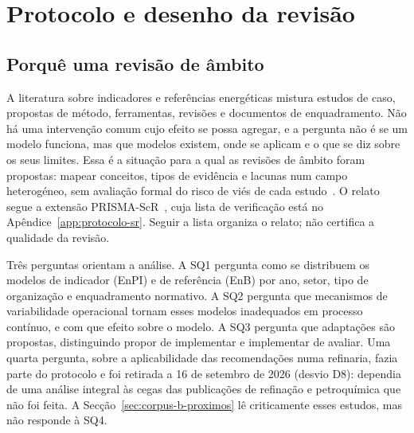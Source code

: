 
\vfill
\section{Protocolo e desenho da revisão}
\label{sec:protocolo-sr}

\subsection{Porquê uma revisão de âmbito}

A literatura sobre indicadores e referências energéticas mistura estudos
de caso, propostas de método, ferramentas, revisões e documentos de
enquadramento. Não há uma intervenção comum cujo efeito se possa agregar,
e a pergunta não é se um modelo funciona, mas que modelos existem, onde
se aplicam e o que se diz sobre os seus limites. Essa é a situação para a
qual as revisões de âmbito foram propostas: mapear conceitos, tipos de
evidência e lacunas num campo heterogéneo, sem avaliação formal do risco
de viés de cada estudo~\cite{Arksey2005,Levac2010,Munn2018}. O relato segue
a extensão PRISMA-ScR~\cite{Tricco2018}, cuja lista de verificação está no
Apêndice~\ref{app:protocolo-sr}. Seguir a lista organiza o relato; não
certifica a qualidade da revisão.

Três perguntas orientam a análise. A SQ1 pergunta como se distribuem os
modelos de indicador (EnPI) e de referência (EnB) por ano, setor, tipo de
organização e enquadramento normativo. A SQ2 pergunta que mecanismos de
variabilidade operacional tornam esses modelos inadequados em processo
contínuo, e com que efeito sobre o modelo. A SQ3 pergunta que adaptações
são propostas, distinguindo propor de implementar e implementar de avaliar.
Uma quarta pergunta, sobre a aplicabilidade das recomendações numa
refinaria, fazia parte do protocolo e foi retirada a 16 de setembro de 2026
(desvio D8): dependia de uma análise integral às cegas das publicações de
refinação e petroquímica que não foi feita. A Secção~\ref{sec:corpus-b-proximos}
lê criticamente esses estudos, mas não responde à SQ4.

